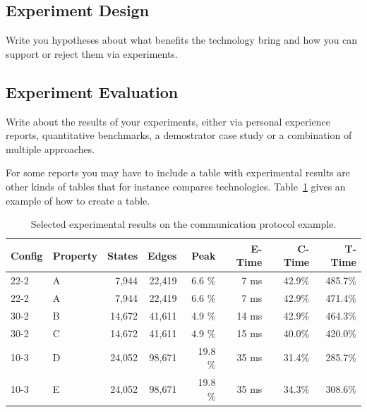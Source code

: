 \subsection{Experiment Design}

Write you hypotheses about what benefits the technology bring and how you can support or reject them via experiments.

\subsection{Experiment Evaluation}

Write about the results of your experiments, either via personal experience reports, quantitative benchmarks, a demostrator case study or a combination of multiple approaches.


For some reports you may have to include a table with experimental
results are other kinds of tables that for instance compares
technologies. Table~\ref{tab:results} gives an example of how to create a table.

\begin{table}[bth]
	\centering
	\begin{tabular}{llrrrrrr}
		Config & Property & States & Edges & Peak & E-Time & C-Time & T-Time
		\\ \hline \hline
		22-2 & A   &    7,944  &   22,419  &  6.6  \%  &  7 ms & 42.9\% &  485.7\% \\
		22-2 & A   &    7,944  &   22,419  &  6.6  \%  &  7 ms & 42.9\% &  471.4\% \\
		30-2 & B   &   14,672  &   41,611  &  4.9  \%  & 14 ms & 42.9\% &  464.3\% \\
		30-2 & C   &   14,672  &   41,611  &  4.9  \%  & 15 ms & 40.0\% &  420.0\% \\ \hline
		10-3 & D   &   24,052  &   98,671  & 19.8  \%  & 35 ms & 31.4\% &  285.7\% \\
		10-3 & E   &   24,052  &   98,671  & 19.8  \%  & 35 ms & 34.3\% &  308.6\% \\
		\hline \hline
	\end{tabular}
	\caption{Selected experimental results on the communication protocol example.}
	\label{tab:results}
\end{table}
